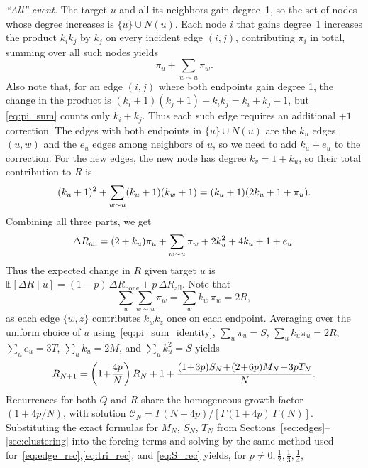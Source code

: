 \documentclass[aps,pre,twocolumn,showpacs,preprintnumbers]{revtex4-2}
\newcommand*{\E}{\mathbb{E}}
\begin{document}
\emph{``All'' event.} The target $u$ and all its neighbors gain degree~1, so the set of nodes whose degree increases is $\{u\}\cup N(u)$. Each node $i$ that gains degree~1 increases the product $k_ik_j$ by $k_j$ on every incident edge $(i,j)$, contributing $\pi_i$ in total, summing over all such nodes yields
\begin{equation}\label{eq:pi_sum}
  \pi_u + \sum_{w\sim u}\pi_w.
\end{equation}
Also note that, for an edge $(i,j)$ where both endpoints gain degree 1, the change in the product is $(k_i+1)(k_j+1)-k_ik_j = k_i+k_j+1$, but \eqref{eq:pi_sum} counts only $k_i+k_j$. Thus each such edge requires an additional $+1$ correction. The edges with both endpoints in $\{u\}\cup N(u)$ are the $k_u$ edges $(u,w)$ and the $e_u$ edges among neighbors of $u$, so we need to add $k_u+e_u$ to the correction. For the new edges, the new node has degree $k_v=1+k_u$, so their total contribution to $R$ is
\begin{equation}
  (k_u+1)^2 + \sum_{w\sim u}(k_u+1)(k_w+1) = (k_u+1)(2k_u+1+\pi_u). \notag
\end{equation}
Combining all three parts, we get
\begin{equation}
  \Delta R_{\mathrm{all}} = (2+k_u)\pi_u + \sum_{w\sim u}\pi_w + 2k_u^2 + 4k_u + 1 + e_u. \notag
\end{equation}
Thus the expected change in $R$ given target $u$ is $\E[\Delta R\mid u] = (1-p)\,\Delta R_{\mathrm{none}} + p\,\Delta R_{\mathrm{all}}$. Note that 
\begin{equation}\label{eq:pi_sum_identity}
  \sum_u\sum_{w\sim u}\pi_w = \sum_w k_w\,\pi_w = 2R,
\end{equation}
as each edge $\{w,z\}$ contributes $k_wk_z$ once on each endpoint. Averaging over the uniform choice of $u$ using~\eqref{eq:pi_sum_identity}, $\sum_u\pi_u = S$, $\sum_u k_u\pi_u = 2R$, $\sum_u e_u = 3T$, $\sum_u k_u = 2M$, and $\sum_u k_u^2 = S$ yields
\begin{equation}\label{eq:R_rec}
  R_{N+1} = \left(1\!+\!\frac{4p}{N}\right)R_N + 1 \notag + \frac{(1\!+\!3p)S_N\!+\!(2\!+\!6p)M_N\!+\!3pT_N}{N}. \notag
\end{equation}
Recurrences for both $Q$ and $R$ share the homogeneous growth factor $(1+4p/N)$, with solution $\mathcal{C}_N = \Gamma(N+4p)/[\Gamma(1+4p)\,\Gamma(N)]$. Substituting the exact formulas for $M_N$, $S_N$, $T_N$ from Sections~\ref{sec:edges}--\ref{sec:clustering} into the forcing terms and solving by the same method used for~\eqref{eq:edge_rec},\eqref{eq:tri_rec}, and \eqref{eq:S_rec} yields, for $p\neq 0,\tfrac{1}{2},\tfrac{1}{3},\tfrac{1}{4}$,
\end{document}
